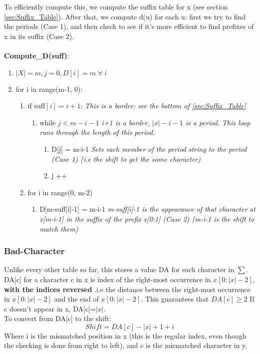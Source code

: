 \noindent To efficiently compute this, we compute the suffix table for x (see section \ref{sec:Suffix_Table}). 
After that, we compute d(u) for each u: first we try to find the periods (Case 1), and then check to see if it's more efficient to find prefixes of x in its suffix (Case 2).\\ \\
\textbf{Compute\_D(suff)}:
\begin{enumerate}[label=\Alph*]
    \item \(|X| = m, j=0, D[i] = m\; \forall\; i \)
    \item for i in range(m-1, 0):
\begin{enumerate}[label=\arabic*]
    \item if $ \text{suff}[i] = i+1 $:  \emph{This is a border: see the bottom of \ref{sec:Suffix_Table}}
    \begin{enumerate}
        \item [] while \( j < m-i-1\) \emph{i+1 is a border, $|x|-i-1$ is a period. This loop runs through the length of this period.}
        \begin{enumerate}
            \item D[j] = m-i-1 \emph{Sets each member of the period string to the period (Case 1) (i.e the shift to get the same character)}
            \item j ++
        \end{enumerate}    
    \end{enumerate}    
    \item for i in range(0, m-2)
    \begin{enumerate}
        \item D[m-suff[i]-1] = m-i-1 \emph{m-suff[i]-1 is the appearance of that character at x[m-i-1] in the suffix of the prefix x[0:1] (Case 2) (m-i-1 is the shift to match them)}
    \end{enumerate}  
\end{enumerate}    
\end{enumerate}

\newpage
\subsubsection{Bad-Character}
Unlike every other table so far, this stores a value DA for each character in $\sum$. DA[c] for a character c in x is index of the right-most occurrence in $x[0:|x|-2]$, \textbf{with the indices reversed }.i.e the distance between the right-most occurrence in $x[0:|x|-2]$ and the end of $x[0:|x|-2]$. This guarantees that $DA[c] \geq 2$ If c doesn't appear in x, DA[c]=$|x|$.\\
To convert from DA[c] to the shift:
\begin{equation}
    Shift = DA[c]-|x|+1+i 
\end{equation}
Where i is the mismatched position in x (this is the regular index, even though the checking is done from right to left), and c is the mismatched character in y. 

